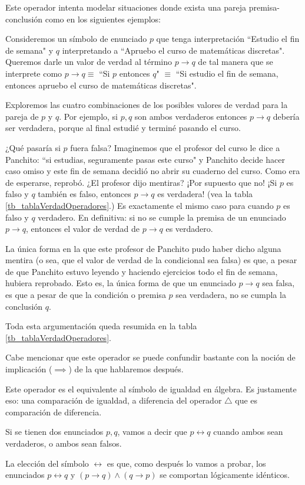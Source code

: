 \documentclass{book}
\theoremstyle{definition}
\begin{document}
\begin{description}
	Este operador intenta modelar situaciones donde exista una pareja premisa-conclusión como en los siguientes ejemplos:
	
	Consideremos un símbolo de enunciado $p$ que tenga interpretación ``Estudio el fin de semana" y $q$ interpretando a ``Apruebo el curso de matemáticas discretas".
	Queremos darle un valor de verdad al término $p \rightarrow q$ de tal manera que se interprete como $p\rightarrow q \equiv$ ``Si $p$ entonces $q$" $\equiv$ ``Si estudio el fin de semana, entonces apruebo el curso de matemáticas discretas".
	
	Exploremos las cuatro combinaciones de los posibles valores de verdad para la pareja de $p$ y $q$.
	Por ejemplo, si $p,q$ son ambos verdaderos entonces $p\rightarrow q$ debería ser verdadera, porque al final estudié y terminé pasando el curso.
	
	¿Qué pasaría si $p$ fuera falsa?
	Imaginemos que el profesor del curso le dice a Panchito: ``si estudias, seguramente pasas este curso" y Panchito decide hacer caso omiso y este fin de semana decidió no abrir su cuaderno del curso. Como era de esperarse, reprobó.
	¿El profesor dijo mentiras? 
	¡Por supuesto que no! 
	¡Si $p$ es falso y $q$ también es falso, entonces $p\rightarrow q$ es verdadera! (vea la tabla \ref{tb_tablaVerdadOperadores}.)
	Es exactamente el mismo caso para cuando $p$ es falso y $q$ verdadero.
	En definitiva: si no se cumple la premisa de un enunciado $p\rightarrow q$, entonces el valor de verdad de $p\rightarrow q$ es verdadero.
	
	La única forma en la que este profesor de Panchito pudo haber dicho alguna mentira (o sea, que el valor de verdad de la condicional sea falsa) es que, a pesar de que Panchito estuvo leyendo y haciendo ejercicios todo el fin de semana, hubiera reprobado.
	Esto es, la única forma de que un enunciado $p\rightarrow q$ sea falsa, es que a pesar de que la condición o premisa $p$ sea verdadera, no se cumpla la conclusión $q$.
	
	Toda esta argumentación queda resumida en la tabla \ref{tb_tablaVerdadOperadores}.
	
	Cabe mencionar que este operador se puede confundir bastante con la noción de implicación ($\implies$) de la que hablaremos después. %
	
	\item[Bicondicional ($\leftrightarrow$)] Este operador es el equivalente al símbolo de igualdad en álgebra. Es justamente eso: una comparación de igualdad, a diferencia del operador $\triangle$ que es comparación de diferencia.
	
	Si se tienen dos enunciados $p,q$, vamos a decir que $p\leftrightarrow q$ cuando ambos sean verdaderos, o ambos sean falsos.
	
	La elección del símbolo $\leftrightarrow$ es que, como después lo vamos a probar, los enunciados $p\leftrightarrow q$ y $(p \rightarrow q) \wedge (q \rightarrow p)$ se comportan lógicamente idénticos. %
\end{description}
\end{document}
